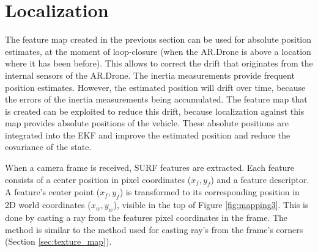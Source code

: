 	\section{Localization}
\label{sec:localization}

The feature map created in the previous section can be used for absolute position estimates, at the moment of loop-closure (when the AR.Drone is above a location where it has been before).
This allows to correct the drift that originates from the internal sensors of the AR.Drone.
The inertia measurements provide frequent position estimates.
However, the estimated position will drift over time, because the errors of the inertia measurements being accumulated.
The feature map that is created can be exploited to reduce this drift, because localization against this map provides absolute positions of the vehicle.
These absolute positions are integrated into the EKF and improve the estimated position and reduce the covariance of the state.

When a camera frame is received, SURF features are extracted.
Each feature consists of a center position in pixel coordinates ($x_f, y_f$) and a feature descriptor.
A feature's center point ($x_f, y_f$) is transformed to its corresponding position in 2D world coordinates ($x_w, y_w$), visible in the top of Figure \ref{fig:mapping3}.
This is done by casting a ray from the features pixel coordinates in the frame.
The method is similar to the method used for casting ray's from the frame's corners (Section \ref{sec:texture_map}).


